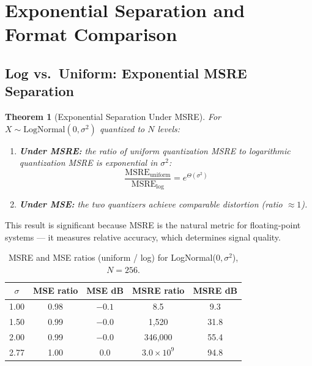 \documentclass[11pt,letterpaper]{article}
\newtheorem{theorem}{Theorem}[section]
\theoremstyle{definition}
\theoremstyle{remark}
\newcommand{\MSRE}{\mathrm{MSRE}}
\begin{document}
\section{Exponential Separation and Format Comparison}
\label{sec:appendix-separation}

\subsection{Log vs.\ Uniform: Exponential MSRE Separation}

\begin{theorem}[Exponential Separation Under MSRE]
\label{thm:separation}
For $X \sim \mathrm{LogNormal}(0, \sigma^2)$ quantized to $N$ levels:
\begin{enumerate}[label=(\roman*)]
  \item \textbf{Under MSRE:} the ratio of uniform quantization MSRE to
    logarithmic quantization MSRE is exponential in $\sigma^2$:
    \begin{equation}
      \frac{\MSRE_{\mathrm{uniform}}}{\MSRE_{\mathrm{log}}}
      = e^{\Theta(\sigma^2)}
      \label{eq:msre-separation}
    \end{equation}
  \item \textbf{Under MSE:} the two quantizers achieve comparable distortion
    (ratio $\approx 1$).
\end{enumerate}
\end{theorem}

This result is significant because MSRE is the natural metric for
floating-point systems --- it measures relative accuracy, which determines
signal quality.

\begin{table}[ht]
\centering
\caption{MSRE and MSE ratios (uniform / log) for LogNormal($0, \sigma^2$),
$N = 256$.}
\label{tab:separation}
\begin{tabular}{@{}ccccc@{}}
\toprule
$\sigma$ & MSE ratio & MSE dB & MSRE ratio & MSRE dB \\
\midrule
1.00  & 0.98  & $-0.1$ & 8.5        & 9.3  \\
1.50  & 0.99  & $-0.0$ & 1,520      & 31.8 \\
2.00  & 0.99  & $-0.0$ & 346,000    & 55.4 \\
2.77  & 1.00  & $0.0$  & $3.0 \times 10^9$ & 94.8 \\
\bottomrule
\end{tabular}
\end{table}
\end{document}
